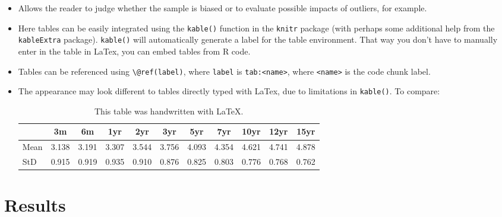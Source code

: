 \documentclass[a4paper,11pt]{article}
\begin{document}
\begin{itemize}
\item
  Allows the reader to judge whether the sample is biased or to evaluate
  possible impacts of outliers, for example.
\item
  Here tables can be easily integrated using the \texttt{kable()} function in the
  \texttt{knitr} package (with perhaps some additional help from the \texttt{kableExtra}
  package). \texttt{kable()} will automatically generate a label for the table
  environment. That way you don't have to manually enter in the table in LaTex,
  you can embed tables from R code.
\item
  Tables can be referenced using \texttt{\textbackslash{}@ref(label)}, where \texttt{label} is \texttt{tab:\textless{}name\textgreater{}},
  where \texttt{\textless{}name\textgreater{}} is the code chunk label.
\item
  The appearance may look different to tables directly typed with LaTex, due to
  limitations in \texttt{kable()}. To compare:
  \begin{table}[ht]
    \begin{center}
        {\footnotesize
        \begin{tabular}{l|cccccccccc}
            \hline \hline
                      & 3m    & 6m    & 1yr   & 2yr   & 3yr   & 5yr   & 7yr   & 10yr  & 12yr  & 15yr   \\
            \hline
                Mean   & 3.138 & 3.191 & 3.307 & 3.544 & 3.756 & 4.093 & 4.354 & 4.621 & 4.741 & 4.878  \\
                StD    & 0.915 & 0.919 & 0.935 & 0.910 & 0.876 & 0.825 & 0.803 & 0.776 & 0.768 & 0.762  \\
            \hline \hline
        \end{tabular}}
    \end{center}
    \caption{This table was handwritten with LaTeX.}
    \label{tab:table2}
    \end{table}
\end{itemize}
\hypertarget{results}{%
\section{Results}\label{results}}
\end{document}
